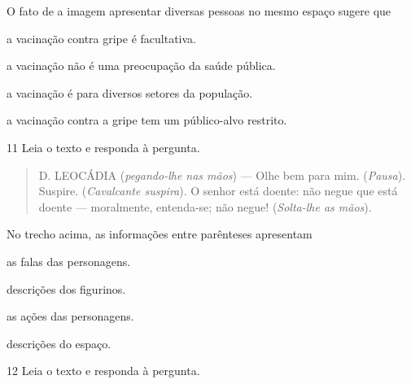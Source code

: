 
O fato de a imagem apresentar diversas pessoas no mesmo espaço sugere
que

\begin{escolha}
  \item a vacinação contra gripe é facultativa.

  \item a vacinação não é uma preocupação da saúde pública.

  \item a vacinação é para diversos setores da população.

  \item a vacinação contra a gripe tem um público-alvo restrito.
\end{escolha}

\num{11} Leia o texto e responda à pergunta.

\begin{quote}
D. LEOCÁDIA (\textit{pegando-lhe nas mãos}) --- Olhe bem para mim. 
(\textit{Pausa}). Suspire. (\textit{Cavalcante suspira}). O senhor está
doente: não negue que está doente --- moralmente, entenda-se; não negue!
(\textit{Solta-lhe as mãos}).

\end{quote}

No trecho acima, as informações entre parênteses apresentam

\begin{escolha}
  \item as falas das personagens.

  \item descrições dos figurinos.

  \item as ações das personagens.

  \item descrições do espaço.
\end{escolha}



\num{12} Leia o texto e responda à pergunta.

